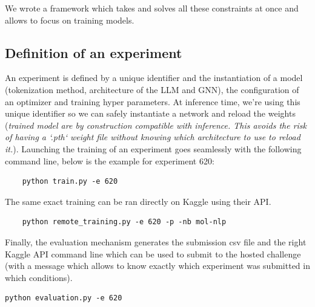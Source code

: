 We wrote a framework which takes and solves all these constraints at once and allows to focus on training models.

\subsection*{Definition of an experiment}
An experiment is defined by a unique identifier and the instantiation of a model (tokenization method, architecture of the LLM and GNN), the configuration of an  optimizer and training hyper parameters. At inference time, we're using this unique identifier so we can safely instantiate a network and reload the weights (\textit{trained model are by construction compatible with inference. This avoids the risk of having a `.pth` weight file without knowing which architecture to use to reload it.}).
Launching the training of an experiment goes seamlessly with the following command line, below is the example for experiment 620:
\begin{verbatim}
    python train.py -e 620
\end{verbatim}

The same exact training can be ran directly on Kaggle using their API.
\begin{verbatim}
    python remote_training.py -e 620 -p -nb mol-nlp
\end{verbatim}
Finally, the evaluation mechanism generates the submission csv file and the right Kaggle API command line which can be used to submit to the hosted challenge (with a message which allows to know exactly which experiment was submitted in which conditions).

\begin{verbatim}
python evaluation.py -e 620
\end{verbatim}

